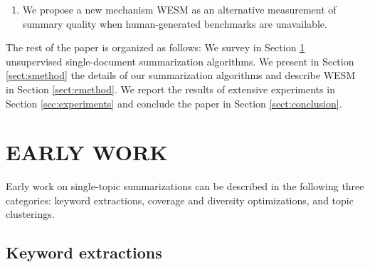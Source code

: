 \documentclass[a4paper,twoside]{article}
\begin{document}
\begin{enumerate}
\vspace*{-3pt}
\item We propose a new mechanism WESM as
%
an alternative measurement of summary quality when human-generated benchmarks are unavailable.
%
%
\end{enumerate}

The rest of the paper is organized as follows:
We survey in Section \ref{sect:work} unsupervised single-document summarization algorithms.
We present in Section \ref{sect:smethod} the details of our summarization algorithms and describe WESM in Section \ref{sect:emethod}. %
We report the results of extensive experiments in Section \ref{sec:experiments} and conclude the paper in
Section \ref{sect:conclusion}.

\section{\uppercase{Early Work}}
\label{sect:work}

\noindent Early work on single-topic summarizations can be described in the following three categories: keyword extractions, coverage and diversity optimizations,
and topic clusterings.

\subsection{Keyword extractions}
\end{document}
